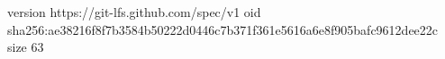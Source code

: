 version https://git-lfs.github.com/spec/v1
oid sha256:ae38216f8f7b3584b50222d0446c7b371f361e5616a6e8f905bafc9612dee22c
size 63
